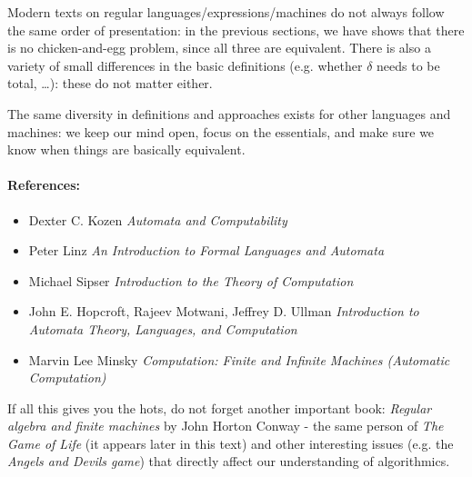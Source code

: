 Modern texts on regular languages/expressions/machines do not always
follow the same order of presentation: in the previous sections, we
have shows that there is no chicken-and-egg problem, since all three
are equivalent. There is also a variety of small differences in the
basic definitions (e.g. whether $\delta$ needs to be total, 
\ldots): these
do not matter either.

The same diversity in definitions and approaches exists for other
languages and machines: we keep our mind open, focus on the
essentials, and make sure we know when things are basically
equivalent.



\paragraph{References:}

\begin{itemize}
\item
Dexter C. Kozen  {\em Automata and Computability}

\item
Peter Linz {\em An Introduction to Formal Languages and Automata}

\item
Michael Sipser {\em Introduction to the Theory of Computation}

\item
John E. Hopcroft, Rajeev Motwani, Jeffrey D. Ullman
{\em Introduction to Automata Theory, Languages, and Computation}

\item
Marvin Lee Minsky {\em Computation: Finite and Infinite Machines
(Automatic Computation)}
\end{itemize}

If all this gives you the hots, do not forget another important
book: {\em Regular algebra and finite machines}
by John Horton Conway - the same person of {\em The Game of Life} (it
appears later in this text) and other interesting issues (e.g. the
{\em Angels and Devils game}) that directly affect our understanding
of algorithmics.



